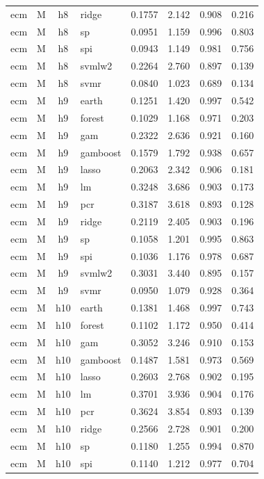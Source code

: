 \begin{ThreePartTable}
\begin{longtable}[t]{llclcccc}
ecm & M & h8 & ridge & 0.1757 & 2.142 & 0.908 & 0.216\\
ecm & M & h8 & sp & 0.0951 & 1.159 & 0.996 & 0.803\\
ecm & M & h8 & spi & 0.0943 & 1.149 & 0.981 & 0.756\\
ecm & M & h8 & svmlw2 & 0.2264 & 2.760 & 0.897 & 0.139\\
ecm & M & h8 & svmr & 0.0840 & 1.023 & 0.689 & 0.134\\
\addlinespace
ecm & M & h9 & earth & 0.1251 & 1.420 & 0.997 & 0.542\\
ecm & M & h9 & forest & 0.1029 & 1.168 & 0.971 & 0.203\\
ecm & M & h9 & gam & 0.2322 & 2.636 & 0.921 & 0.160\\
ecm & M & h9 & gamboost & 0.1579 & 1.792 & 0.938 & 0.657\\
ecm & M & h9 & lasso & 0.2063 & 2.342 & 0.906 & 0.181\\
ecm & M & h9 & lm & 0.3248 & 3.686 & 0.903 & 0.173\\
ecm & M & h9 & pcr & 0.3187 & 3.618 & 0.893 & 0.128\\
ecm & M & h9 & ridge & 0.2119 & 2.405 & 0.903 & 0.196\\
ecm & M & h9 & sp & 0.1058 & 1.201 & 0.995 & 0.863\\
ecm & M & h9 & spi & 0.1036 & 1.176 & 0.978 & 0.687\\
ecm & M & h9 & svmlw2 & 0.3031 & 3.440 & 0.895 & 0.157\\
ecm & M & h9 & svmr & 0.0950 & 1.079 & 0.928 & 0.364\\
\addlinespace
ecm & M & h10 & earth & 0.1381 & 1.468 & 0.997 & 0.743\\
ecm & M & h10 & forest & 0.1102 & 1.172 & 0.950 & 0.414\\
ecm & M & h10 & gam & 0.3052 & 3.246 & 0.910 & 0.153\\
ecm & M & h10 & gamboost & 0.1487 & 1.581 & 0.973 & 0.569\\
ecm & M & h10 & lasso & 0.2603 & 2.768 & 0.902 & 0.195\\
ecm & M & h10 & lm & 0.3701 & 3.936 & 0.904 & 0.176\\
ecm & M & h10 & pcr & 0.3624 & 3.854 & 0.893 & 0.139\\
ecm & M & h10 & ridge & 0.2566 & 2.728 & 0.901 & 0.200\\
ecm & M & h10 & sp & 0.1180 & 1.255 & 0.994 & 0.870\\
ecm & M & h10 & spi & 0.1140 & 1.212 & 0.977 & 0.704\\

\end{longtable}
\end{ThreePartTable}

